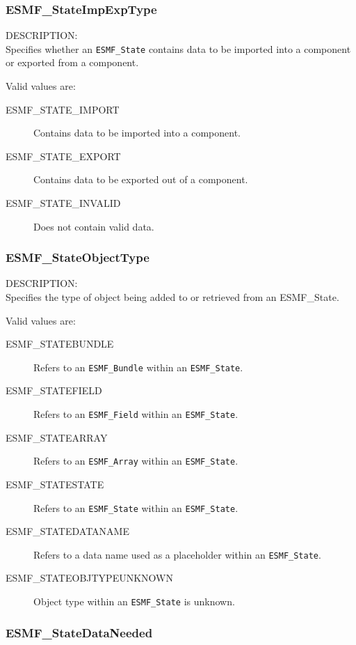 
\subsubsection{ESMF\_StateImpExpType}

{\sf DESCRIPTION:\\}
Specifies whether an {\tt ESMF\_State} contains data to be imported
into a component or exported from a component. 

Valid values are:
\begin{description}
   \item [ESMF\_STATE\_IMPORT] 
         Contains data to be imported into a component.
   \item [ESMF\_STATE\_EXPORT]
         Contains data to be exported out of a component.
   \item [ESMF\_STATE\_INVALID]
         Does not contain valid data.
\end{description}

\subsubsection{ESMF\_StateObjectType}

{\sf DESCRIPTION:\\}
Specifies the type of object being added to or retrieved from an
{ESMF\_State.}

Valid values are:
\begin{description}
   \item [ESMF\_STATEBUNDLE] 
         Refers to an {\tt ESMF\_Bundle} within an {\tt ESMF\_State}.
   \item [ESMF\_STATEFIELD]
         Refers to an {\tt ESMF\_Field} within an {\tt ESMF\_State}.
   \item [ESMF\_STATEARRAY]
         Refers to an {\tt ESMF\_Array} within an {\tt ESMF\_State}.
   \item [ESMF\_STATESTATE]
         Refers to an {\tt ESMF\_State} within an {\tt ESMF\_State}.
   \item [ESMF\_STATEDATANAME]
         Refers to a data name used as a placeholder within 
         an {\tt ESMF\_State}.
   \item [ESMF\_STATEOBJTYPEUNKNOWN]
         Object type within an {\tt ESMF\_State} is unknown.
\end{description}

\subsubsection{ESMF\_StateDataNeeded}

